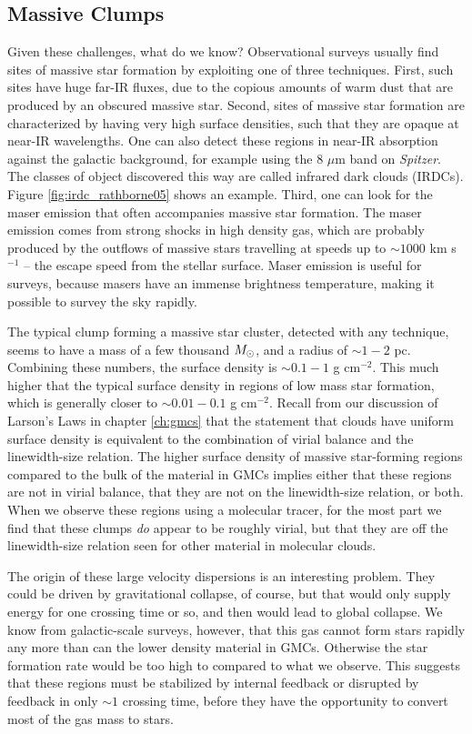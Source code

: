 \subsection{Massive Clumps}

Given these challenges, what do we know? Observational surveys usually find sites of massive star formation by exploiting one of three techniques. First, such sites have huge far-IR fluxes, due to the copious amounts of warm dust that are produced by an obscured massive star. Second, sites of massive star formation are characterized by having very high surface densities, such that they are opaque at near-IR wavelengths. One can also detect these regions in near-IR absorption against the galactic background, for example using the 8 $\mu$m band on \textit{Spitzer}. The classes of object discovered this way are called infrared dark clouds (IRDCs). Figure \ref{fig:irdc_rathborne05} shows an example. Third, one can look for the maser emission that often accompanies massive star formation. The maser emission comes from strong shocks in high density gas, which are probably produced by the outflows of massive stars travelling at speeds up to $\sim 1000$ km s$^{-1}$ -- the escape speed from the stellar surface. Maser emission is useful for surveys, because masers have an immense brightness temperature, making it possible to survey the sky rapidly.

The typical clump forming a massive star cluster, detected with any technique, seems to have a mass of a few thousand $M_{\odot}$, and a radius of $\sim 1-2$ pc. Combining these numbers, the surface density is $\sim 0.1-1$ g cm$^{-2}$. This much higher that the typical surface density in regions of low mass star formation, which is generally closer to $\sim 0.01 - 0.1$ g cm$^{-2}$.  Recall from our discussion of Larson's Laws in chapter \ref{ch:gmcs} that the statement that clouds have uniform surface density is equivalent to the combination of virial balance and the linewidth-size relation. The higher surface density of massive star-forming regions compared to the bulk of the material in GMCs implies either that these regions are not in virial balance, that they are not on the linewidth-size relation, or both. When we observe these regions using a molecular tracer, for the most part we find that these clumps {\it do} appear to be roughly virial, but that they are off the linewidth-size relation seen for other material in molecular clouds.

The origin of these large velocity dispersions is an interesting problem. They could be driven by gravitational collapse, of course, but that would only supply energy for one crossing time or so, and then would lead to global collapse. We know from galactic-scale surveys, however, that this gas cannot form stars rapidly any more than can the lower density material in GMCs. Otherwise the star formation rate would be too high to compared to what we observe. This suggests that these regions must be stabilized by internal feedback or disrupted by feedback in only $\sim 1$ crossing time, before they have the opportunity to convert most of the gas mass to stars.

